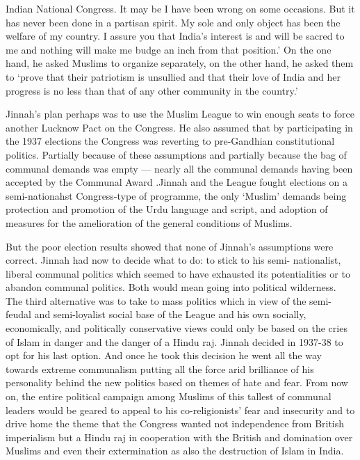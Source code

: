Indian National Congress. It may be I have been wrong on some occasions. But it has never been done in a partisan spirit. My sole and only object has been the welfare of my country. I assure you that India's interest is and will be sacred to me and nothing will make me budge an inch from that position.' On the one hand, he asked Muslims to organize separately, on the other hand, he asked them to `prove that their patriotism is unsullied and that their love of India and her progress is no less than that of any other community in the country.' 

Jinnah's plan perhaps was to use the Muslim League to win enough seats to force another Lucknow Pact on the Congress. He also assumed that by participating in the 1937 elections the Congress was reverting to pre-Gandhian constitutional politics. Partially because of these assumptions and partially because the bag of communal demands was empty — nearly all the communal demands having been accepted by the Communal Award .Jinnah and the League fought elections on a semi-nationahst Congress-type of programme, the only `Muslim' demands being protection and promotion of the Urdu language and script, and adoption of measures for the amelioration of the general conditions of Muslims. 

But the poor election results showed that none of Jinnah's assumptions were correct. Jinnah had now to decide what to do: to stick to his semi- nationalist, liberal communal politics which seemed to have exhausted its potentialities or to abandon communal politics. Both would mean going into political wilderness. The third alternative was to take to mass politics which in view of the semi-feudal and semi-loyalist social base of the League and his own socially, economically, and politically conservative views could only be based on the cries of Islam in danger and the danger of a Hindu raj. Jinnah decided in 1937-38 to opt for his last option. And once he took this decision he went all the way towards extreme communalism putting all the force arid brilliance of his personality behind the new politics based on themes of hate and fear. From now on, the entire political campaign among Muslims of this tallest of communal leaders would be geared to appeal to his co-religionists' fear and insecurity and to drive home the theme that the Congress wanted not independence from British imperialism but a Hindu raj in cooperation with the British and domination over Muslims and even their extermination as also the destruction of Islam in India. 

